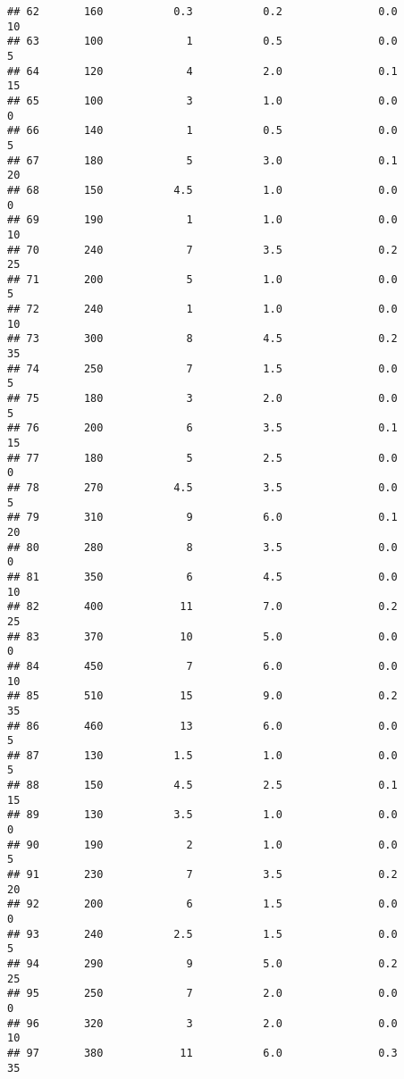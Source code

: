 \documentclass[
]{article}
\begin{document}
\begin{verbatim}
## 62       160           0.3           0.2               0.0          10
## 63       100             1           0.5               0.0           5
## 64       120             4           2.0               0.1          15
## 65       100             3           1.0               0.0           0
## 66       140             1           0.5               0.0           5
## 67       180             5           3.0               0.1          20
## 68       150           4.5           1.0               0.0           0
## 69       190             1           1.0               0.0          10
## 70       240             7           3.5               0.2          25
## 71       200             5           1.0               0.0           5
## 72       240             1           1.0               0.0          10
## 73       300             8           4.5               0.2          35
## 74       250             7           1.5               0.0           5
## 75       180             3           2.0               0.0           5
## 76       200             6           3.5               0.1          15
## 77       180             5           2.5               0.0           0
## 78       270           4.5           3.5               0.0           5
## 79       310             9           6.0               0.1          20
## 80       280             8           3.5               0.0           0
## 81       350             6           4.5               0.0          10
## 82       400            11           7.0               0.2          25
## 83       370            10           5.0               0.0           0
## 84       450             7           6.0               0.0          10
## 85       510            15           9.0               0.2          35
## 86       460            13           6.0               0.0           5
## 87       130           1.5           1.0               0.0           5
## 88       150           4.5           2.5               0.1          15
## 89       130           3.5           1.0               0.0           0
## 90       190             2           1.0               0.0           5
## 91       230             7           3.5               0.2          20
## 92       200             6           1.5               0.0           0
## 93       240           2.5           1.5               0.0           5
## 94       290             9           5.0               0.2          25
## 95       250             7           2.0               0.0           0
## 96       320             3           2.0               0.0          10
## 97       380            11           6.0               0.3          35

\end{verbatim}
\end{document}
